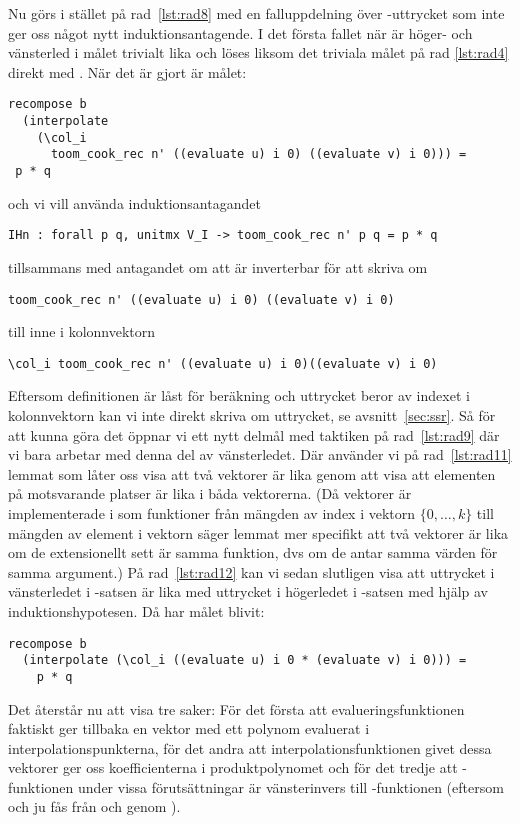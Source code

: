 Nu görs i stället på
rad~\ref{lst:rad8} med  en falluppdelning över -uttrycket
som inte ger oss något nytt induktionsantagende.
I det första fallet när  är höger- och
vänsterled i målet trivialt lika
och löses liksom det triviala målet på rad \ref{lst:rad4} direkt med \C{//}.
När det är gjort är målet:
\begin{lstlisting}
recompose b
  (interpolate
    (\col_i
      toom_cook_rec n' ((evaluate u) i 0) ((evaluate v) i 0))) =
 p * q
\end{lstlisting}
och vi vill använda induktionsantagandet
\begin{lstlisting}
IHn : forall p q, unitmx V_I -> toom_cook_rec n' p q = p * q
\end{lstlisting}
tillsammans med antagandet  om att  är inverterbar för att
skriva om
\begin{lstlisting}
toom_cook_rec n' ((evaluate u) i 0) ((evaluate v) i 0)
\end{lstlisting}
till  inne i kolonnvektorn
\begin{lstlisting}
\col_i toom_cook_rec n' ((evaluate u) i 0)((evaluate v) i 0)
\end{lstlisting}
Eftersom definitionen  är låst för beräkning och uttrycket beror av
indexet  i kolonnvektorn kan vi inte direkt skriva om uttrycket, se
avsnitt~\ref{sec:ssr}. Så för att kunna göra det öppnar vi ett nytt delmål
med taktiken  på rad~\ref{lst:rad9} där vi bara arbetar med denna del av
vänsterledet. Där använder vi på rad~\ref{lst:rad11} lemmat  som låter oss visa
att två vektorer är lika genom att visa att elementen på motsvarande platser är
lika i båda vektorerna. (Då vektorer är implementerade i \ssr{} som funktioner
från mängden av index i vektorn $\{0, \ldots , k\}$ till mängden av element i
vektorn säger lemmat mer specifikt att två vektorer är lika om de extensionellt
sett är samma funktion, dvs om de antar samma värden för samma argument.) På
rad~\ref{lst:rad12} kan vi sedan slutligen visa att uttrycket i vänsterledet i
-satsen är lika med uttrycket i högerledet i -satsen med hjälp
av induktionshypotesen. Då har målet blivit:
\begin{lstlisting}
recompose b
  (interpolate (\col_i ((evaluate u) i 0 * (evaluate v) i 0))) =
    p * q
\end{lstlisting}

Det återstår nu att visa tre saker: För det första att evalueringsfunktionen
 faktiskt ger tillbaka en vektor med ett polynom evaluerat i
interpolationspunkterna, för det andra att interpolationsfunktionen
 givet dessa vektorer ger oss koefficienterna i produktpolynomet
 och för det tredje att -funktionen under vissa
förutsättningar är vänsterinvers till -funktionen (eftersom  och
 ju fås från  och  genom ).

